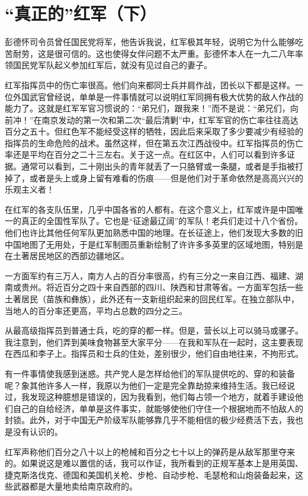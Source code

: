 \documentclass[10pt]{book}
\begin{document}
\section{“真正的”红军（下）}

彭德怀司令员曾任国民党将军，他告诉我说，红军极其年轻，说明它为什么能够吃苦耐劳，这是很可信的。这也使得女伴问题不太严重。彭德怀本人在一九二八年率领国民党军队起义参加红军后，就没有见过自己的妻子。

红军指挥员中的伤亡率很高。他们向来都同士兵并肩作战，团长以下都是这样。一位外国武官曾经说，单单是一件事情就可以说明红军同拥有极大优势的敌人作战的能力了。这就是红军军官习惯说的：“弟兄们，跟我来！”而不是说：“弟兄们，向前冲！”在南京发动的第一次和第二次“最后清剿”中，红军军官的伤亡率往往高达百分之五十。但红色军不能经受这样的牺牲，因此后来采取了多少要减少有经验的指挥员的生命危险的战术。虽然这样，但在第五次江西战役中。红军指挥员的伤亡率还是平均在百分之二十三左右。关于这一点。在红区中，人们可以看到许多证据。通常可以看到，二十刚出头的青年就丢了一只胳臂或一条腿，或者是手指被打掉了，或者是头上或身上留有难看的伤痕——但是他们对于革命依然是高高兴兴的乐观主义者！

在红军的各支队伍里，几乎中国各省的人都有。在这个意义上，红军或许是中国唯一的真正的全国性军队了。它也是“征途最辽阔”的军队！老兵们走过十八个省份。他们也许比其他任何军队更加熟悉中国的地理。在长征途上，他们发现大多数的旧中国地图了无用处，于是红军制图员重新绘制了许许多多英里的区域地图，特别是在土著居民地区的西部边疆地区。

一方面军约有三万人，南方人占的百分率很高，约有三分之一来自江西、福建、湖南或贵州。将近百分之四十来自西部的四川、陕西和甘肃等省。一方面军包括一些土著居民（苗族和彝族），此外还有一支新组织起来的回民红军。在独立部队中，当地人的百分率还更高，平均占总数的四分之三。

从最高级指挥员到普通士兵，吃的穿的都一样。但是，营长以上可以骑马或骡子。我注意到，他们弄到美味食物甚至大家平分——在我和军队在一起时，这主要表现在西瓜和李子上。指挥员和士兵的住处，差别很少，他们自由地往来，不拘形式。

有一件事情使我感到迷惑。共产党人是怎样给他们的军队提供吃的、穿的和装备呢？象其他许多人一样，我原以为他们一定是完全靠劫掠来维持生活。我已经说过，我发现这种臆想是错误的，因为我看到，他们每占领一个地方，就着手建设他们自己的自给经济，单单是这件事实，就能够使他们守住一个根据地而不怕敌人的封锁。此外，对于中国无产阶级军队能够靠几乎不能相信的极少经费活下去，我也是没有认识的。

红军声称他们百分之八十以上的枪械和百分之七十以上的弹药是从敌军那里夺来的。如果说这是难以置信的话，我可以作证，我所看到的正规军基本上是用英国、捷克斯洛伐克、德国和美国机关枪、步枪、自动步枪、毛瑟枪和山炮装备起来，这些武器都是大量地卖给南京政府的。
\end{document}
